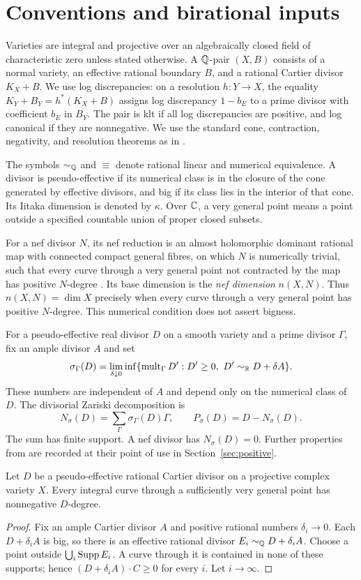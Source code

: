 \section{Conventions and birational inputs}
\label{sec:preliminaries}

Varieties are integral and projective over an algebraically closed
field of characteristic zero unless stated otherwise. A $\mathbb Q$-pair
$(X,B)$ consists of a normal variety, an effective rational boundary
$B$, and a rational Cartier divisor $K_X+B$. We use log discrepancies:
on a resolution $h:Y\to X$, the equality
$K_Y+B_Y=h^*(K_X+B)$ assigns log discrepancy $1-b_E$ to a prime divisor
with coefficient $b_E$ in $B_Y$. The pair is klt if all log
discrepancies are positive, and log canonical if they are nonnegative.
We use the standard cone, contraction, negativity, and resolution
theorems as in \cite{KM,BCHM}.

The symbols $\sim_\mathbb Q$ and $\equiv$ denote rational linear and numerical
equivalence. A divisor is pseudo-effective if its numerical class is
in the closure of the cone generated by effective divisors, and big if
its class lies in the interior of that cone. Its Iitaka dimension is
denoted by $\kappa$. Over $\mathbb C$, a very general point means a point
outside a specified countable union of proper closed subsets.

For a nef divisor $N$, its nef reduction is an almost holomorphic
dominant rational map with connected compact general fibres, on which
$N$ is numerically trivial, such that every curve through a very
general point not contracted by the map has positive $N$-degree
\cite{NefReduction}. Its base dimension is the \emph{nef dimension}
$n(X,N)$. Thus $n(X,N)=\dim X$ precisely when every curve through a
very general point has positive $N$-degree. This numerical condition
does not assert bigness.

For a pseudo-effective real divisor $D$ on a smooth variety and a
prime divisor $\Gamma$, fix an ample divisor $A$ and set
\[
 \sigma_\Gamma(D)=\lim_{\delta\downarrow0}
 \inf\{\operatorname{mult}_\Gamma D':D'\ge0,\ D'\sim_\mathbb R D+\delta A\}.
\]
These numbers are independent of $A$ and depend only on the numerical
class of $D$. The divisorial Zariski decomposition is
\[
 N_\sigma(D)=\sum_\Gamma\sigma_\Gamma(D)\Gamma,
 \qquad P_\sigma(D)=D-N_\sigma(D).
\]
The sum has finite support. A nef divisor has $N_\sigma(D)=0$.
Further properties from \cite{Nakayama,LP} are recorded at their point
of use in Section~\ref{sec:positive}.

\begin{lemma}\label{lemma:pseudo-vg}
Let $D$ be a pseudo-effective rational Cartier divisor on a projective
complex variety $X$. Every integral curve through a sufficiently very
general point has nonnegative $D$-degree.
\end{lemma}
\begin{proof}
Fix an ample Cartier divisor $A$ and positive rational numbers
$\delta_i\to0$. Each $D+\delta_iA$ is big, so there is an effective
rational divisor $E_i\sim_\mathbb Q D+\delta_iA$. Choose a point outside
$\bigcup_i\operatorname{Supp} E_i$. A curve through it is contained in none of
these supports; hence $(D+\delta_iA)\cdot C\ge0$ for every $i$.
Let $i\to\infty$.
\end{proof}

